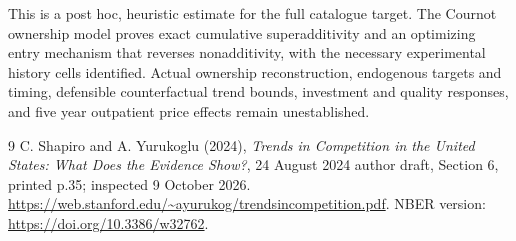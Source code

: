 \documentclass[11pt]{article}
\theoremstyle{remark}
\begin{document}
This is a post hoc, heuristic estimate for the full catalogue target.
The Cournot ownership model proves exact cumulative superadditivity and an optimizing entry mechanism that reverses nonadditivity, with the necessary experimental history cells identified. Actual ownership reconstruction, endogenous targets and timing, defensible counterfactual trend bounds, investment and quality responses, and five year outpatient price effects remain unestablished.

\begin{thebibliography}{9}
 C. Shapiro and A. Yurukoglu (2024), \emph{Trends in Competition in the United States: What Does the Evidence Show?}, 24 August 2024 author draft, Section 6, printed p.35; inspected 9 October 2026. \url{https://web.stanford.edu/~ayurukog/trendsincompetition.pdf}. NBER version: \url{https://doi.org/10.3386/w32762}.
\end{thebibliography}
\end{document}
